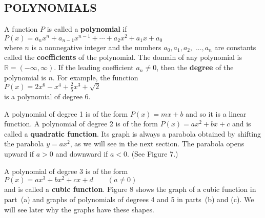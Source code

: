\documentclass{sebase}
\begin{document}
\subsection{POLYNOMIALS}

\noindent A function $P$ is called a \textbf{polynomial} if\\[6pt]
\hspace*{\fill}$P(x)=a_{n}x^{n}+a_{n-1}x^{n-1}+\cdots
+a_{2}x^{2}+a_{1}x+a_{0}$\hspace*{\fill}\\[6pt]
where $n$ is a nonnegative integer and the numbers $a_{0},a_{1},a_{2},$ $%
...,a_{n}$ are constants called the \textbf{coefficients} of the polynomial.
The domain of any polynomial is $\mathbb{R}=(-\infty ,\infty ).$ If the
leading coefficient $a_{n}\neq 0$, then the \textbf{degree }of the
polynomial is $n$. For example, the function\\[6pt]
\hspace*{\fill}$P\!\left( x\right) =2x^{6}-x^{4}+\tfrac{2}{5}x^{3}+\sqrt{2}$%
\hspace*{\fill}\\[6pt]
is a polynomial of degree 6.

A polynomial of degree 1 is of the form $P(x)=mx+b$ and so it is a linear
function. A polynomial of degree 2 is of the form $P(x)=ax^{2}+bx+c$ and is
called a \textbf{quadratic function}. Its graph is always a parabola
obtained by shifting the parabola $y=ax^{2}$, as we will see in the next
section. The parabola opens upward if $a>0$ and downward if $a<0$. (See
Figure 7.)\\[6pt]
\hspace*{\fill}\hspace*{\fill}%
\vspace*{9pt}

A polynomial of degree 3 is of the form\\[6pt]
\hspace*{\fill}$P(x)=ax^{3}+bx^{2}+cx+d\qquad \left( a\neq 0\right) $%
\hspace*{\fill}\\[6pt]
and is called a \textbf{cubic function}. Figure 8 shows the graph of a cubic
function in part~(a) and graphs of polynomials of degrees 4 and 5 in
parts~(b) and (c). We will see later why the graphs have these shapes.%
\vspace*{6pt}
\end{document}
